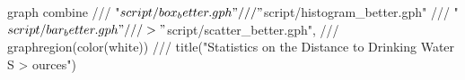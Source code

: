 graph combine ///
        "$script/box_better.gph" ///
        "$script/histogram_better.gph" ///      
        "$script/bar_better.gph" ///                         
>            
        "$script/scatter_better.gph", ///
        graphregion(color(white)) ///
        title("Statistics on the Distance to Drinking Water S
> ources")
